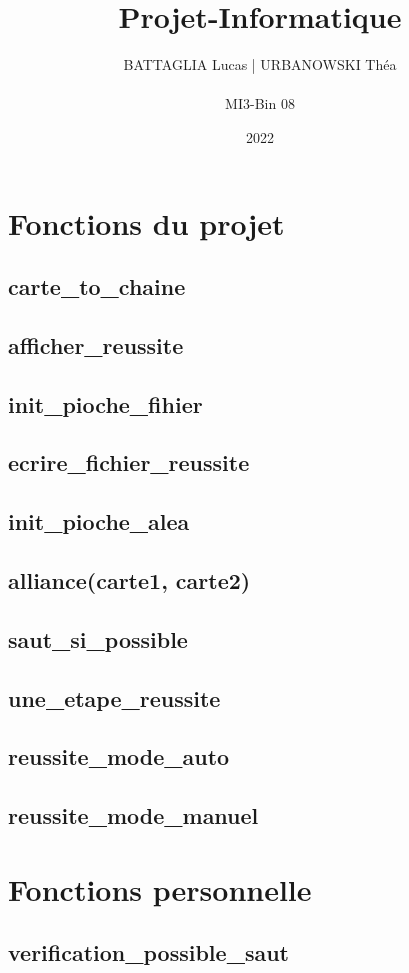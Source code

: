 \documentclass{article}
\title{\huge \textbf{Projet-Informatique}}
\author{BATTAGLIA Lucas | URBANOWSKI Théa \\ \\ MI3-Bin 08}
\date{2022}
\begin{document}
\maketitle

\section{Fonctions du projet}
\subsection{carte_to_chaine}
\subsection{afficher_reussite}
\subsection{init_pioche_fihier}
\subsection{ecrire_fichier_reussite}
\subsection{init_pioche_alea}
\subsection{alliance(carte1, carte2)}
\subsection{saut_si_possible}
\subsection{une_etape_reussite}
\subsection{reussite_mode_auto}
\subsection{reussite_mode_manuel}
\section{Fonctions personnelle}
\subsection{verification_possible_saut}
\end{document}
